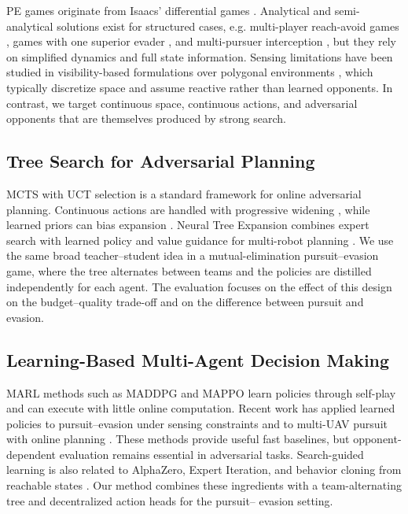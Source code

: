 \documentclass[letterpaper,10pt,conference]{ieeeconf}
\begin{document}
PE games originate from Isaacs' differential games
\cite{isaacs1965differential}. Analytical and
semi-analytical solutions exist for structured cases, e.g. multi-player
reach-avoid games \cite{garcia2021multiple}, games with one superior
evader \cite{chen2016multiplayer}, and multi-pursuer interception
\cite{pierson2017intercepting}, but they rely on simplified dynamics and
full state information. Sensing limitations have been studied in
visibility-based formulations over polygonal environments
\cite{zhang2019tree}, which typically discretize space and
assume reactive rather than learned opponents. In contrast, we target
continuous space, continuous actions, and adversarial opponents that are
themselves produced by strong search.

\subsection{Tree Search for Adversarial Planning}

MCTS with UCT selection \cite{kocsis2006bandit,browne2012survey} is a
standard framework for online adversarial planning. Continuous actions are
handled with progressive widening \cite{couetoux2011continuous,
chaslot2008progressive}, while learned priors can bias expansion
\cite{rosin2011multi,auer2002finite}. Neural Tree Expansion combines
expert search with learned policy and value guidance for multi-robot
planning \cite{riviere2021neural}. We use the same broad teacher--student
idea in a mutual-elimination pursuit--evasion game, where the tree
alternates between teams and the policies are distilled independently for
each agent. The evaluation focuses on the effect of this design on the
budget--quality trade-off and on the difference between pursuit and
evasion.

\subsection{Learning-Based Multi-Agent Decision Making}

MARL methods such as MADDPG \cite{lowe2017multi} and MAPPO
\cite{yu2021surprising} learn policies through self-play
\cite{baker2020emergent} and can execute with little online computation.
Recent work has applied learned policies to pursuit--evasion under sensing
constraints \cite{gonultas2025pursuit,wang2024viper} and to multi-UAV
pursuit with online planning \cite{chen2025online}. These methods provide
useful fast baselines, but opponent-dependent evaluation remains essential
in adversarial tasks. Search-guided learning is also related to AlphaZero,
Expert Iteration, and behavior cloning from reachable states
\cite{silver2018general,anthony2017thinking,pomerleau1989alvinn,
ross2011reduction}. Our method combines these ingredients with a
team-alternating tree and decentralized action heads for the pursuit--
evasion setting.
\end{document}
